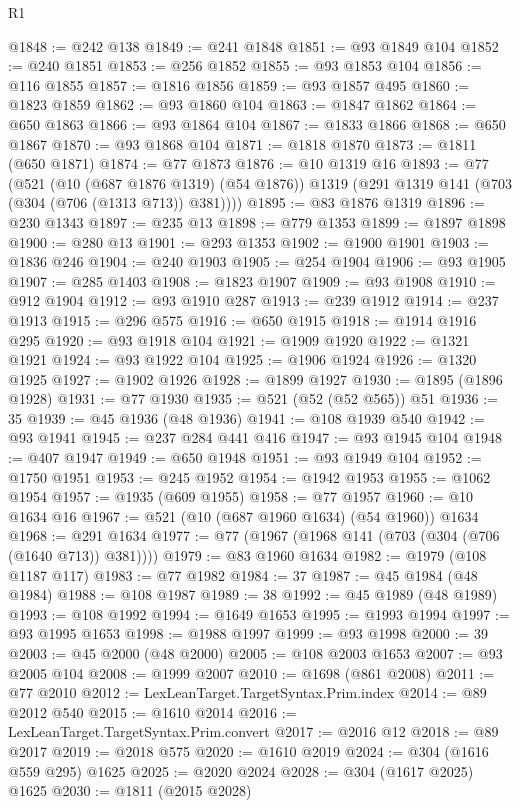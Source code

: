 \begin{lexlean}{R1}
\begin{coremodule}
@1848 := @242 @138
@1849 := @241 @1848
@1851 := @93 @1849 @104
@1852 := @240 @1851
@1853 := @256 @1852
@1855 := @93 @1853 @104
@1856 := @116 @1855
@1857 := @1816 @1856
@1859 := @93 @1857 @495
@1860 := @1823 @1859
@1862 := @93 @1860 @104
@1863 := @1847 @1862
@1864 := @650 @1863
@1866 := @93 @1864 @104
@1867 := @1833 @1866
@1868 := @650 @1867
@1870 := @93 @1868 @104
@1871 := @1818 @1870
@1873 := @1811 (@650 @1871)
@1874 := @77 @1873
@1876 := @10 @1319 @16
@1893 := @77
    (@521
      (@10 (@687 @1876 @1319) (@54 @1876))
      @1319
      (@291 @1319 @141 (@703 (@304 (@706 (@1313 @713)) @381))))
@1895 := @83 @1876 @1319
@1896 := @230 @1343
@1897 := @235 @13
@1898 := @779 @1353
@1899 := @1897 @1898
@1900 := @280 @13
@1901 := @293 @1353
@1902 := @1900 @1901
@1903 := @1836 @246
@1904 := @240 @1903
@1905 := @254 @1904
@1906 := @93 @1905
@1907 := @285 @1403
@1908 := @1823 @1907
@1909 := @93 @1908
@1910 := @912 @1904
@1912 := @93 @1910 @287
@1913 := @239 @1912
@1914 := @237 @1913
@1915 := @296 @575
@1916 := @650 @1915
@1918 := @1914 @1916 @295
@1920 := @93 @1918 @104
@1921 := @1909 @1920
@1922 := @1321 @1921
@1924 := @93 @1922 @104
@1925 := @1906 @1924
@1926 := @1320 @1925
@1927 := @1902 @1926
@1928 := @1899 @1927
@1930 := @1895 (@1896 @1928)
@1931 := @77 @1930
@1935 := @521 (@52 (@52 @565)) @51
@1936 := 35
@1939 := @45 @1936 (@48 @1936)
@1941 := @108 @1939 @540
@1942 := @93 @1941
@1945 := @237 @284 @441 @416
@1947 := @93 @1945 @104
@1948 := @407 @1947
@1949 := @650 @1948
@1951 := @93 @1949 @104
@1952 := @1750 @1951
@1953 := @245 @1952
@1954 := @1942 @1953
@1955 := @1062 @1954
@1957 := @1935 (@609 @1955)
@1958 := @77 @1957
@1960 := @10 @1634 @16
@1967 := @521 (@10 (@687 @1960 @1634) (@54 @1960)) @1634
@1968 := @291 @1634
@1977 := @77 (@1967 (@1968 @141 (@703 (@304 (@706 (@1640 @713)) @381))))
@1979 := @83 @1960 @1634
@1982 := @1979 (@108 @1187 @117)
@1983 := @77 @1982
@1984 := 37
@1987 := @45 @1984 (@48 @1984)
@1988 := @108 @1987
@1989 := 38
@1992 := @45 @1989 (@48 @1989)
@1993 := @108 @1992
@1994 := @1649 @1653
@1995 := @1993 @1994
@1997 := @93 @1995 @1653
@1998 := @1988 @1997
@1999 := @93 @1998
@2000 := 39
@2003 := @45 @2000 (@48 @2000)
@2005 := @108 @2003 @1653
@2007 := @93 @2005 @104
@2008 := @1999 @2007
@2010 := @1698 (@861 @2008)
@2011 := @77 @2010
@2012 := LexLeanTarget.TargetSyntax.Prim.index
@2014 := @89 @2012 @540
@2015 := @1610 @2014
@2016 := LexLeanTarget.TargetSyntax.Prim.convert
@2017 := @2016 @12
@2018 := @89 @2017
@2019 := @2018 @575
@2020 := @1610 @2019
@2024 := @304 (@1616 @559 @295) @1625
@2025 := @2020 @2024
@2028 := @304 (@1617 @2025) @1625
@2030 := @1811 (@2015 @2028)

\end{coremodule}
\end{lexlean}
